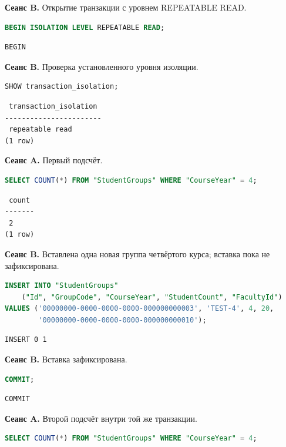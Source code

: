 \documentclass[12pt,a4paper]{article}
\begin{document}
\textbf{Сеанс B.} Открытие транзакции с уровнем REPEATABLE READ.
\begin{lstlisting}[language=SQL]
BEGIN ISOLATION LEVEL REPEATABLE READ;
\end{lstlisting}

\begin{lstlisting}
BEGIN
\end{lstlisting}

\textbf{Сеанс B.} Проверка установленного уровня изоляции.
\begin{lstlisting}[language=SQL]
SHOW transaction_isolation;
\end{lstlisting}

\begin{lstlisting}
 transaction_isolation
-----------------------
 repeatable read
(1 row)
\end{lstlisting}

\textbf{Сеанс A.} Первый подсчёт.
\begin{lstlisting}[language=SQL]
SELECT COUNT(*) FROM "StudentGroups" WHERE "CourseYear" = 4;
\end{lstlisting}

\begin{lstlisting}
 count
-------
 2
(1 row)
\end{lstlisting}

\textbf{Сеанс B.} Вставлена одна новая группа четвёртого курса; вставка пока не зафиксирована.
\begin{lstlisting}[language=SQL]
INSERT INTO "StudentGroups"
    ("Id", "GroupCode", "CourseYear", "StudentCount", "FacultyId")
VALUES ('00000000-0000-0000-0000-000000000003', 'TEST-4', 4, 20,
        '00000000-0000-0000-0000-000000000010');
\end{lstlisting}

\begin{lstlisting}
INSERT 0 1
\end{lstlisting}

\textbf{Сеанс B.} Вставка зафиксирована.
\begin{lstlisting}[language=SQL]
COMMIT;
\end{lstlisting}

\begin{lstlisting}
COMMIT
\end{lstlisting}

\textbf{Сеанс A.} Второй подсчёт внутри той же транзакции.
\begin{lstlisting}[language=SQL]
SELECT COUNT(*) FROM "StudentGroups" WHERE "CourseYear" = 4;
\end{lstlisting}
\end{document}

